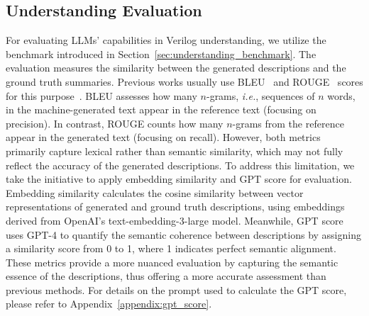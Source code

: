 \subsection{Understanding Evaluation}
\label{sec:understanding_evaluation}
For evaluating LLMs' capabilities in Verilog understanding, we utilize the benchmark introduced in Section~\ref{sec:understanding_benchmark}. The evaluation measures the similarity between the generated descriptions and the ground truth summaries. Previous works usually use BLEU~\citep{papineni2002bleu} and ROUGE~\citep{lin2004rouge} scores for this purpose~\citep{wang2023codet5+}. 
BLEU assesses how many $n$-grams, \textit{i.e.}, sequences of $n$ words, in the machine-generated text appear in the reference text (focusing on precision). In contrast, ROUGE counts how many $n$-grams from the reference appear in the generated text (focusing on recall). 
However, both metrics primarily capture lexical rather than semantic similarity, which may not fully reflect the accuracy of the generated descriptions.
To address this limitation, we take the initiative to apply embedding similarity and GPT score for evaluation.
Embedding similarity calculates the cosine similarity between vector representations of generated and ground truth descriptions, using embeddings derived from OpenAI's text-embedding-3-large model. Meanwhile, GPT score uses GPT-4 to quantify the semantic coherence between descriptions by assigning a similarity score from 0 to 1, where 1 indicates perfect semantic alignment.
These metrics provide a more nuanced evaluation by capturing the semantic essence of the descriptions, thus offering a more accurate assessment than previous methods.
For details on the prompt used to calculate the GPT score, please refer to Appendix~\ref{appendix:gpt_score}.

